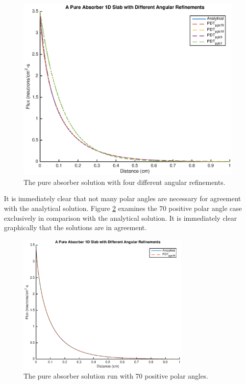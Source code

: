 \documentclass{anstrans}
\begin{document}
\begin{figure}
\centering
\includegraphics[scale = 0.5]{figures/PureAbsorberAllAngles.eps}
\caption{The pure absorber solution with four different angular refinements.}
\label{pa_allangles}
\end{figure}

It is immediately clear that not many polar angles are necessary for agreement with the analytical solution. Figure \ref{pa_bestangle} examines the 70 positive polar angle case exclusively in comparison with the analytical solution. It is immediately clear graphically that the solutions are in agreement.

\begin{figure}
\centering
\includegraphics[width=85mm]{figures/PureAbsorberBestangle.eps}
\caption{The pure absorber solution run with 70 positive polar angles.}
\label{pa_bestangle}
\end{figure}
\end{document}
